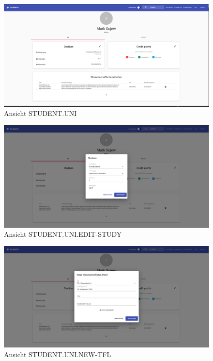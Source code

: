 \documentclass[
  12pt,
  ngerman,
  a4paper,
]{article}
\begin{document}
\begin{figure}
\centering
\includegraphics{./tex2pdf.-c803d322dfea80aa/7b7decc77183e1f8259e6c4265ee1b64e115eb3a.png}
\caption{Ansicht STUDENT.UNI}
\end{figure}

\begin{figure}
\centering
\includegraphics{./tex2pdf.-c803d322dfea80aa/592db6fdc0133bda72392ec386b61b235cfd34b2.png}
\caption{Ansicht STUDENT.UNI.EDIT-STUDY}
\end{figure}

\begin{figure}
\centering
\includegraphics{./tex2pdf.-c803d322dfea80aa/c8129831c98a80007f8fd71f31b9f91dda318a5d.png}
\caption{Ansicht STUDENT.UNI.NEW-TFL}
\end{figure}
\end{document}
